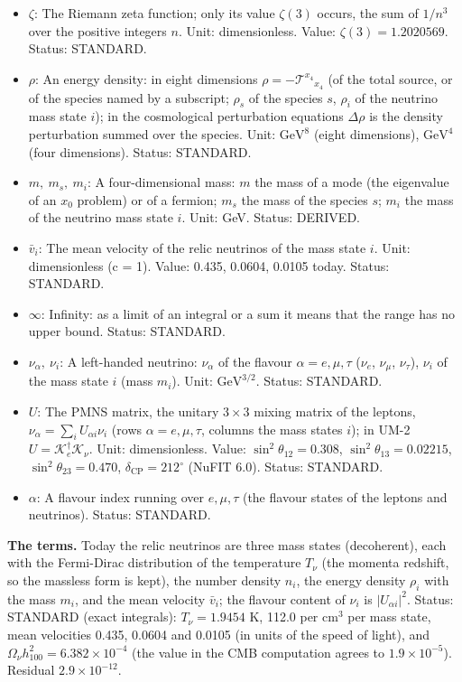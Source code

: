 \documentclass[
  10pt,
]{article}
\begin{document}
\begin{itemize}
  its diameter. Unit: dimensionless. Value: 3.141592654. Status:
  STANDARD.
\item
  \(\zeta\): The Riemann zeta function; only its value \(\zeta(3)\)
  occurs, the sum of \(1/n^3\) over the positive integers \(n\). Unit:
  dimensionless. Value: \(\zeta(3) = 1.2020569\). Status: STANDARD.
\item
  \(\rho\): An energy density: in eight dimensions
  \(\rho = -\mathcal{T}^{x_4}{}_{x_4}\) (of the total source, or of the
  species named by a subscript; \(\rho_s\) of the species \(s\),
  \(\rho_i\) of the neutrino mass state \(i\)); in the cosmological
  perturbation equations \(\Delta\rho\) is the density perturbation
  summed over the species. Unit: \(\mathrm{GeV}^{8}\) (eight
  dimensions), \(\mathrm{GeV}^{4}\) (four dimensions). Status: STANDARD.
\item
  \(m,\ m_s,\ m_i\): A four-dimensional mass: \(m\) the mass of a mode
  (the eigenvalue of an \(x_0\) problem) or of a fermion; \(m_s\) the
  mass of the species \(s\); \(m_i\) the mass of the neutrino mass state
  \(i\). Unit: GeV. Status: DERIVED.
\item
  \(\bar v_i\): The mean velocity of the relic neutrinos of the mass
  state \(i\). Unit: dimensionless (c = 1). Value: 0.435, 0.0604, 0.0105
  today. Status: STANDARD.
\item
  \(\infty\): Infinity: as a limit of an integral or a sum it means that
  the range has no upper bound. Status: STANDARD.
\item
  \(\nu_\alpha,\ \nu_i\): A left-handed neutrino: \(\nu_\alpha\) of the
  flavour \(\alpha = e, \mu, \tau\) (\(\nu_e\), \(\nu_\mu\),
  \(\nu_\tau\)), \(\nu_i\) of the mass state \(i\) (mass \(m_i\)). Unit:
  \(\mathrm{GeV}^{3/2}\). Status: STANDARD.
\item
  \(U\): The PMNS matrix, the unitary \(3 \times 3\) mixing matrix of
  the leptons, \(\nu_\alpha = \sum_iU_{\alpha i}\nu_i\) (rows
  \(\alpha = e, \mu, \tau\), columns the mass states \(i\)); in UM-2
  \(U = \mathcal{K}_e^\dagger\mathcal{K}_\nu\). Unit: dimensionless.
  Value: \(\sin^2\theta_{12} = 0.308\), \(\sin^2\theta_{13} = 0.02215\),
  \(\sin^2\theta_{23} = 0.470\), \(\delta_{\mathrm{CP}} = 212^\circ\)
  (NuFIT 6.0). Status: STANDARD.
\item
  \(\alpha\): A flavour index running over \(e, \mu, \tau\) (the flavour
  states of the leptons and neutrinos). Status: STANDARD.
\end{itemize}

\textbf{The terms.} Today the relic neutrinos are three mass states
(decoherent), each with the Fermi-Dirac distribution of the temperature
\(T_\nu\) (the momenta redshift, so the massless form is kept), the
number density \(n_i\), the energy density \(\rho_i\) with the mass
\(m_i\), and the mean velocity \(\bar v_i\); the flavour content of
\(\nu_i\) is \(\lvert U_{\alpha i}\rvert^2\). Status: STANDARD (exact
integrals): \(T_\nu = 1.9454\) K, 112.0 per cm\(^3\) per mass state,
mean velocities 0.435, 0.0604 and 0.0105 (in units of the speed of
light), and \(\Omega_\nu h_{100}^2 = 6.382\times10^{-4}\) (the value in
the CMB computation agrees to \(1.9\times10^{-5}\)). Residual
\(2.9\times10^{-12}\).
\end{document}

